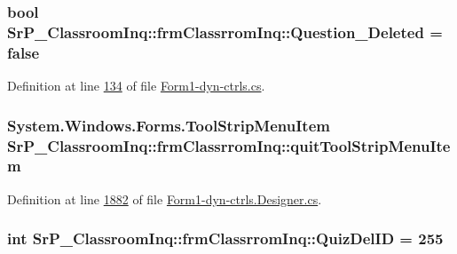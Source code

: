 \hypertarget{class_sr_p___classroom_inq_1_1frm_classrrom_inq_a8f54ae3a0ea7bb9dafed984a53155fd8}{
\subsubsection[{\-Question\-\_\-\-Deleted}]{\setlength{\rightskip}{0pt plus 5cm}bool {\bf \-Sr\-P\-\_\-\-Classroom\-Inq\-::frm\-Classrrom\-Inq\-::\-Question\-\_\-\-Deleted} = false}}
\label{class_sr_p___classroom_inq_1_1frm_classrrom_inq_a8f54ae3a0ea7bb9dafed984a53155fd8}


\-Definition at line \hyperlink{_form1-dyn-ctrls_8cs_source_l00134}{134} of file \hyperlink{_form1-dyn-ctrls_8cs_source}{\-Form1-\/dyn-\/ctrls.\-cs}.

\hypertarget{class_sr_p___classroom_inq_1_1frm_classrrom_inq_a7e4ada35eda1d7984167b62ab487ace7}{
\subsubsection[{quit\-Tool\-Strip\-Menu\-Item}]{\setlength{\rightskip}{0pt plus 5cm}\-System.\-Windows.\-Forms.\-Tool\-Strip\-Menu\-Item {\bf \-Sr\-P\-\_\-\-Classroom\-Inq\-::frm\-Classrrom\-Inq\-::quit\-Tool\-Strip\-Menu\-Item}}}
\label{class_sr_p___classroom_inq_1_1frm_classrrom_inq_a7e4ada35eda1d7984167b62ab487ace7}


\-Definition at line \hyperlink{_form1-dyn-ctrls_8_designer_8cs_source_l01882}{1882} of file \hyperlink{_form1-dyn-ctrls_8_designer_8cs_source}{\-Form1-\/dyn-\/ctrls.\-Designer.\-cs}.

\hypertarget{class_sr_p___classroom_inq_1_1frm_classrrom_inq_a2221a860fdb3bc2837b3ca3c0cee182c}{
\subsubsection[{\-Quiz\-Del\-I\-D}]{\setlength{\rightskip}{0pt plus 5cm}int {\bf \-Sr\-P\-\_\-\-Classroom\-Inq\-::frm\-Classrrom\-Inq\-::\-Quiz\-Del\-I\-D} = 255}}
\label{class_sr_p___classroom_inq_1_1frm_classrrom_inq_a2221a860fdb3bc2837b3ca3c0cee182c}


